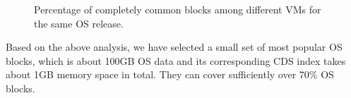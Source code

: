 
\begin{figure}
\centering
{}
\caption{Percentage of completely common blocks among different VMs for the same OS release.}
\label{fig:OSunchanged}
\end{figure}

Based on the above analysis, we have selected a small set of most popular
OS blocks, which is about 100GB OS data and its corresponding CDS index takes about 1GB memory space in total.
They can cover sufficiently over 70\% OS blocks.







